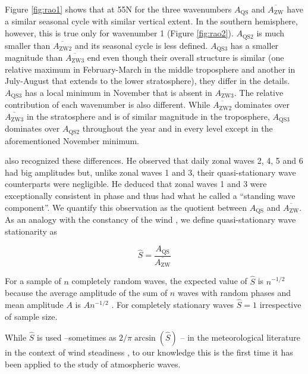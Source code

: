 \documentclass[draft,linenumbers]{agujournal2018}
\begin{document}
Figure \ref{fig:rao1} shows that at 55\degree N for the three
wavenumbers \(A_\mathrm{QS}\) and \(\overline{A_\mathrm{ZW}}\) have a
similar seasonal cycle with similar vertical extent. In the southern
hemisphere, however, this is true only for wavenumber 1 (Figure
\ref{fig:rao2}). \(A_\mathrm{QS2}\) is much smaller than
\(\overline{A_\mathrm{ZW2}}\) and its seasonal cycle is less defined.
\(A_\mathrm{QS3}\) has a smaller magnitude than
\(\overline{A_\mathrm{ZW3}}\) end even though their overall structure is
similar (one relative maximum in February-March in the middle
troposphere and another in July-August that extends to the lower
stratosphere), they differ in the details. \(A_\mathrm{QS3}\) has a
local minimum in November that is absent in
\(\overline{A_\mathrm{ZW3}}\). The relative contribution of each
wavenumber is also different. While \(\overline{A_\mathrm{ZW2}}\)
dominates over \(\overline{A_\mathrm{ZW3}}\) in the stratosphere and is
of similar magnitude in the troposphere, \(A_\mathrm{QS3}\) dominates
over \(A_\mathrm{QS2}\) throughout the year and in every level except in
the aforementioned November minimum.

\citet{Loon1972} also recognized these differences. He observed that
daily zonal waves 2, 4, 5 and 6 had big amplitudes but, unlike zonal
waves 1 and 3, their quasi-stationary wave counterparts were negligible.
He deduced that zonal waves 1 and 3 were exceptionally consistent in
phase and thus had what he called a ``standing wave component''. We
quantify this observation as the quotient between \(A_\mathrm{QS}\) and
\(\overline{A_\mathrm{ZW}}\). As an analogy with the constancy of the
wind \citep{Singer1967}, we define quasi-stationary wave stationarity as

\begin{linenomath*}
\begin{equation}\label{eq:S}
\hat{S} = \frac{A_\mathrm{QS}}{\overline{A_\mathrm{ZW}}}
\end{equation}
\end{linenomath*}

For a sample of \(n\) completely random waves, the expected value of
\(\hat{S}\) is \(n^{-1/2}\) because the average amplitude of the sum of
\(n\) waves with random phases and mean amplitude \(A\) is \(An^{-1/2}\)
\citep{Pain2005}. For completely stationary waves \(\hat{S} = 1\)
irrespective of sample size.

While \(\hat{S}\) is used --sometimes as
\(2/\pi\arcsin \left (\hat{S} \right )\) \citep{Singer1967}-- in the
meteorological literature in the context of wind steadiness
\citep[e.g][]{Hiscox2010}, to our knowledge this is the first time it
has been applied to the study of atmospheric waves.
\end{document}
